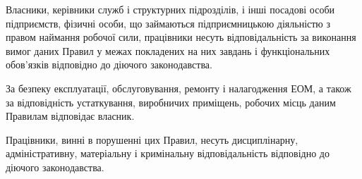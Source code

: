 \documentclass[simple,a4paper,14pt,ukrainian,utf8]{eskdtext}
\begin{document}
\begin{appendices}
                Власники, керівники служб і структурних підрозділів, і інші посадові особи підприємств, фізичні особи, що займаються підприємницькою діяльністю з правом наймання робочої сили, працівники несуть відповідальність за виконання вимог даних Правил у межах покладених на них завдань і функціональних обов'язків відповідно до діючого законодавства.

                За безпеку експлуатації, обслуговування, ремонту і налагодження ЕОМ, а також за відповідність устаткування, виробничих приміщень, робочих місць даним Правилам відповідає власник.

                Працівники, винні в порушенні цих Правил, несуть дисциплінарну, адміністративну, матеріальну і кримінальну відповідальність відповідно до діючого законодавства.

    \end{appendices}

\newpage


\renewcommand\bibname{Використана література}

\end{document}
